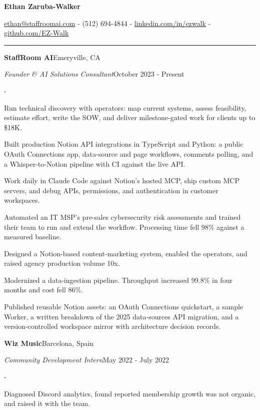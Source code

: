 \documentclass[10pt,letterpaper]{article}
\newenvironment{cvitems}{%
  \begin{list}{-}{%
    \setlength{\leftmargin}{12pt}%
    \setlength{\itemsep}{1.2pt}%
    \setlength{\parsep}{0pt}%
    \setlength{\topsep}{1.5pt}%
    \setlength{\partopsep}{0pt}%
    \setlength{\labelwidth}{6pt}%
    \setlength{\labelsep}{6pt}%
    \setlength{\itemindent}{0pt}%
  }%
}{\end{list}}
\newcommand{\cvsection}[1]{%
  \vspace{7pt}%
  \noindent{\bfseries\fontsize{11pt}{13pt}\selectfont\MakeUppercase{#1}}\par
  \vspace{1pt}%
  \noindent\rule{\textwidth}{0.4pt}\par
  \vspace{4pt}%
}
\newcommand{\cventryhead}[4]{%
  \noindent\textbf{#1}\hfill#2\par
  \vspace{0.5pt}%
  \noindent\textit{#3}\hfill#4\par
}
\begin{document}
\begin{center}
  {\bfseries\fontsize{22pt}{24pt}\selectfont Ethan Zaruba-Walker\par}
  \vspace{4pt}
  {\fontsize{10pt}{12pt}\selectfont
    \href{mailto:ethan@staffroomai.com}{ethan@staffroomai.com}
    {-}
    (512) 694-4844
    {-}
    \href{https://linkedin.com/in/ezwalk}{linkedin.com/in/ezwalk}
    {-}
    \href{https://github.com/EZ-Walk}{github.com/EZ-Walk}\par}
\end{center}
\vspace{2pt}

\cvsection{Experience}

\cventryhead{StaffRoom AI}{Emeryville, CA}
{Founder \& AI Solutions Consultant}{October 2023 - Present}
\begin{cvitems}
  \item Run technical discovery with operators: map current systems, assess feasibility, estimate effort, write the SOW, and deliver milestone-gated work for clients up to \$18K.
  \item Built production Notion API integrations in TypeScript and Python: a public OAuth Connections app, data-source and page workflows, comments polling, and a Whisper-to-Notion pipeline with CI against the live API.
  \item Work daily in Claude Code against Notion's hosted MCP, ship custom MCP servers, and debug APIs, permissions, and authentication in customer workspaces.
  \item Automated an IT MSP's pre-sales cybersecurity risk assessments and trained their team to run and extend the workflow. Processing time fell 98\% against a measured baseline.
  \item Designed a Notion-based content-marketing system, enabled the operators, and raised agency production volume 10x.
  \item Modernized a data-ingestion pipeline. Throughput increased 99.8\% in four months and cost fell 86\%.
  \item Published reusable Notion assets: an OAuth Connections quickstart, a sample Worker, a written breakdown of the 2025 data-sources API migration, and a version-controlled workspace mirror with architecture decision records.
\end{cvitems}

\vspace{3pt}
\cventryhead{Wiz Music}{Barcelona, Spain}
{Community Development Intern}{May 2022 - July 2022}
\begin{cvitems}
  \item Diagnosed Discord analytics, found reported membership growth was not organic, and raised it with the team.
\end{cvitems}
\end{document}
